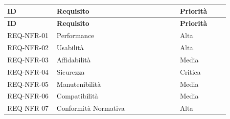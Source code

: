 \begin{longtable}{|p{0.20\linewidth}|p{0.50\linewidth}|p{0.20\linewidth}|}
\hline
\textbf{ID} & \textbf{Requisito} & \textbf{Priorità} \\ \hline
\endfirsthead

\hline
\textbf{ID} & \textbf{Requisito} & \textbf{Priorità} \\ \hline
\endhead

\hline
\endfoot

REQ-NFR-01 & Performance & Alta \\ \hline
REQ-NFR-02 & Usabilità & Alta \\ \hline
REQ-NFR-03 & Affidabilità & Media \\ \hline
REQ-NFR-04 & Sicurezza & Critica \\ \hline
REQ-NFR-05 & Manutenibilità & Media \\ \hline
REQ-NFR-06 & Compatibilità & Media \\ \hline
REQ-NFR-07 & Conformità Normativa & Alta \\ \hline

\end{longtable}